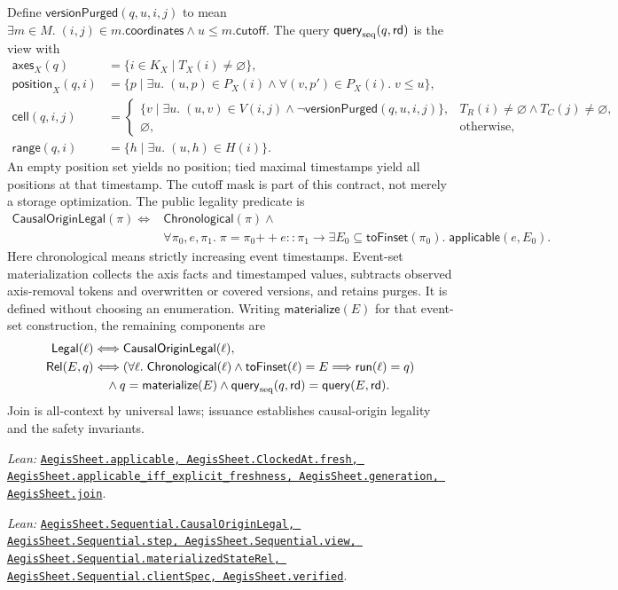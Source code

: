 \documentclass[11pt]{article}
\theoremstyle{definition}
\newcommand{\src}[2]{\href{../../#1}{\texttt{#2}}}
\newcommand{\anchor}[2]{\par\smallskip\noindent\emph{Lean: }\src{#1}{#2}.}
\begin{document}
Define $\mathsf{versionPurged}(q,u,i,j)$ to mean
$\exists m\in M.\;(i,j)\in m.\mathsf{coordinates}\land u\le m.\mathsf{cutoff}$.
The query $\mathsf{query}_{\rm seq}(q,\mathsf{rd})$ is the view with
\[
\begin{aligned}
 \mathsf{axes}_X(q)&=\{i\in K_X\mid T_X(i)\ne\varnothing\},\\
 \mathsf{position}_X(q,i)&=\{p\mid\exists u.\;(u,p)\in P_X(i)\land
       \forall(v,p')\in P_X(i).\;v\le u\},\\
 \mathsf{cell}(q,i,j)&=\begin{cases}
 \{v\mid\exists u.\;(u,v)\in V(i,j)\land\neg\mathsf{versionPurged}(q,u,i,j)\},
   &T_R(i)\ne\varnothing\land T_C(j)\ne\varnothing,\\
 \varnothing,&\text{otherwise},
 \end{cases}\\
 \mathsf{range}(q,i)&=\{h\mid\exists u.\;(u,h)\in H(i)\}.
\end{aligned}
\]
An empty position set yields no position; tied maximal timestamps yield all
positions at that timestamp. The cutoff mask is part of this contract, not
merely a storage optimization.
The public legality predicate is
\[
\begin{aligned}
 \mathsf{CausalOriginLegal}(\pi)\Longleftrightarrow{}&
 \mathsf{Chronological}(\pi)\land\\
 &\forall\pi_0,e,\pi_1.\;\pi=\pi_0{+\!+}e::\pi_1\to
 \exists E_0\subseteq\mathsf{toFinset}(\pi_0).\;
 \mathsf{applicable}(e,E_0).
\end{aligned}
\]
Here chronological means strictly increasing event timestamps. Event-set
materialization collects the axis facts and timestamped values, subtracts
observed axis-removal tokens and overwritten or covered versions, and retains
purges. It is defined without choosing an enumeration.
Writing $\mathsf{materialize}(E)$ for that event-set construction, the
remaining components are
\[
\begin{aligned}
 \mathsf{Legal}(\ell)&\Longleftrightarrow\mathsf{CausalOriginLegal}(\ell),\\
 \mathsf{Rel}(E,q)&\Longleftrightarrow
   (\forall\ell.\;\mathsf{Chronological}(\ell)\land\mathsf{toFinset}(\ell)=E
       \Longrightarrow\mathsf{run}(\ell)=q)\\
 &\quad\land q=\mathsf{materialize}(E)
       \land\mathsf{query}_{\rm seq}(q,\mathsf{rd})=\mathsf{query}(E,\mathsf{rd}).
\end{aligned}
\]
Join is all-context by universal
laws; issuance establishes causal-origin legality and the safety invariants.
\anchor{Sal/MRDTs/Instances/AegisSheet.lean}
  {AegisSheet.applicable, AegisSheet.ClockedAt.fresh,
   AegisSheet.applicable\_iff\_explicit\_freshness,
   AegisSheet.generation, AegisSheet.join}
\anchor{Sal/MRDTs/Instances/AegisSheetSequential.lean}
  {AegisSheet.Sequential.CausalOriginLegal,
   AegisSheet.Sequential.step, AegisSheet.Sequential.view,
   AegisSheet.Sequential.materializedStateRel,
   AegisSheet.Sequential.clientSpec, AegisSheet.verified}
\end{document}
